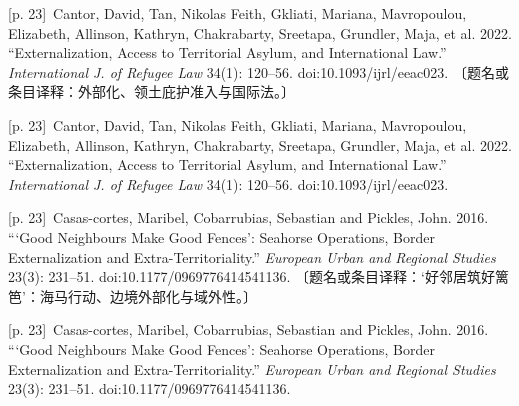 \documentclass[10pt,a4paper]{article}
\begin{document}
\noindent\begin{minipage}{\textwidth}\begin{minipage}[t]{\dimexpr.5\textwidth-4mm\relax}{\scriptsize\color{gray} [p. 23]}\ Cantor, David, Tan, Nikolas Feith, Gkliati, Mariana, Mavropoulou, Elizabeth, Allinson, Kathryn, Chakrabarty, Sreetapa, Grundler, Maja, et al. 2022. “Externalization, Access to Territorial Asylum, and International Law.” \textit{International J. of Refugee Law} 34(1): 120–56. doi:10.1093/ijrl/eeac023. 〔题名或条目译释：外部化、领土庇护准入与国际法。〕\par\end{minipage}\hfill\begin{minipage}[t]{\dimexpr.5\textwidth-4mm\relax}{\scriptsize\color{gray} [p. 23]}\ Cantor, David, Tan, Nikolas Feith, Gkliati, Mariana, Mavropoulou, Elizabeth, Allinson, Kathryn, Chakrabarty, Sreetapa, Grundler, Maja, et al. 2022. “Externalization, Access to Territorial Asylum, and International Law.” \textit{International J. of Refugee Law} 34(1): 120–56. doi:10.1093/ijrl/eeac023.\par\end{minipage}\end{minipage}\par
\noindent\begin{minipage}{\textwidth}\begin{minipage}[t]{\dimexpr.5\textwidth-4mm\relax}{\scriptsize\color{gray} [p. 23]}\ Casas-cortes, Maribel, Cobarrubias, Sebastian and Pickles, John. 2016. “‘Good Neighbours Make Good Fences’: Seahorse Operations, Border Externalization and Extra-Territoriality.” \textit{European Urban and Regional Studies} 23(3): 231–51. doi:10.1177/0969776414541136. 〔题名或条目译释：‘好邻居筑好篱笆’：海马行动、边境外部化与域外性。〕\par\end{minipage}\hfill\begin{minipage}[t]{\dimexpr.5\textwidth-4mm\relax}{\scriptsize\color{gray} [p. 23]}\ Casas-cortes, Maribel, Cobarrubias, Sebastian and Pickles, John. 2016. “‘Good Neighbours Make Good Fences’: Seahorse Operations, Border Externalization and Extra-Territoriality.” \textit{European Urban and Regional Studies} 23(3): 231–51. doi:10.1177/0969776414541136.\par\end{minipage}\end{minipage}\par
\end{document}
